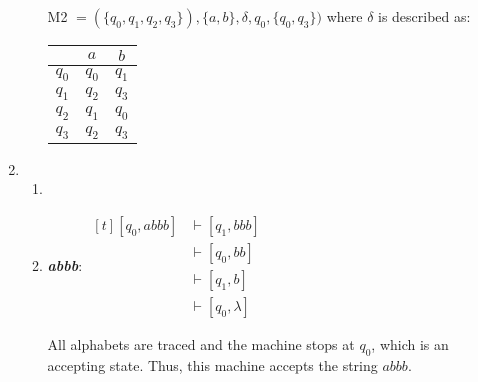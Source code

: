 \documentclass[a4paper, 12pt]{article}
\begin{document}
\begin{enumerate}
\begin{enumerate}
\begin{center}
            \end{center}
            \vspace{5mm}

            M2 \(= (\{q_0, q_1, q_2, q_3\}), \{a, b\}, \delta, q_0, \{q_0, q_3\})\) where \(\delta\) is described as:
            \begin{center}

            \begin{tabular}{c|cc}
                 & $a$ & $b$ \\ \hline
                $q_0$ & $q_0$ & $q_1$ \\
                $q_1$ & $q_2$ & $q_3$ \\
                $q_2$ & $q_1$ & $q_0$ \\
                $q_3$ & $q_2$ & $q_3$
            \end{tabular}
            \end{center}
        \end{enumerate}
        \item
        \begin{enumerate}
            \item \makebox[0pt][r]{\quad}

            \begin{minipage}{\linewidth}
                \centering
            \end{minipage}
            
            \item 
            \textbf{\textit{abbb}}:
            \( \begin{aligned}[t]
                [q_0, abbb] &\vdash [q_1, bbb] \\
                &\vdash [q_0, bb] \\
                &\vdash [q_1, b] \\
                &\vdash [q_0, \lambda]
            \end{aligned} \)

            All alphabets are traced and the machine stops at $q_0$, which is an accepting state. Thus, this machine accepts the string $abbb$.


\end{enumerate}
\end{enumerate}
\end{document}
